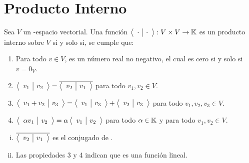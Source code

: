 \chapter{Producto Interno}

\begin{dfn}
Sea $V$ un \dobleK-espacio vectorial. Una función $\left\langle \begin{array}{c|c} \cdot & \cdot \end{array}\right\rangle: V\times V \to \mathbb{K}$ es un producto interno sobre $V$ si y solo si, se cumple que:
\begin{enumerate}
    \item Para todo $v \in V$,   es un número real no negativo, el cual es cero si y solo si $v = 0_V$.  
    \item $\left\langle \begin{array}{c|c} v_1 & v_2 \end{array}\right\rangle = \overline{\left\langle \begin{array}{c|c} v_2 & v_1 \end{array}\right\rangle}$ para todo $v_1,v_2 \in V$.
    \item $\left\langle \begin{array}{c|c} v_1 + v_2 & v_3 \end{array}\right\rangle = \left\langle \begin{array}{c|c} v_1 & v_3 \end{array}\right\rangle + \left\langle \begin{array}{c|c} v_2 & v_3 \end{array}\right\rangle$ para todo $v_1, v_2, v_3 \in V$.
    \item $\left\langle \begin{array}{c|c} \alpha v_1 & v_2 \end{array}\right\rangle = \alpha \left\langle \begin{array}{c|c} v_1 & v_2 \end{array}\right\rangle$ para todo $\alpha \in \mathbb{K}$ y para todo $v_1, v_2 \in V$.
\end{enumerate}
\begin{obs}
    \begin{enumerate}[i.]
        \item $\overline{\left\langle \begin{array}{c|c} v_2 & v_1 \end{array}\right\rangle}$ es el conjugado de .
        \item Las propiedades 3 y 4 indican que \prodInt{\cdot}{\cdot} es una función lineal.
    \end{enumerate}
    
    
\end{obs}
\end{dfn}

